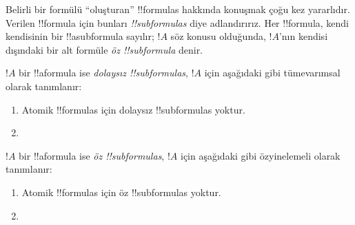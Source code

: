 



\begin{explain}
Belirli bir formülü ``oluşturan'' !!{formula}s hakkında konuşmak çoğu
kez yararlıdır. Verilen !!{formula} için bunları
\emph{!!{subformula}s} diye adlandırırız. Her !!{formula}, kendi kendisinin bir
!!a{subformula} sayılır; $!A$ söz konusu olduğunda, $!A$'nın kendisi dışındaki bir alt formüle
\emph{öz !!{subformula}} denir.
\end{explain}

\begin{defn}
$!A$ bir !!a{formula} ise \emph{dolaysız !!{subformula}s}, $!A$ için
aşağıdaki gibi tümevarımsal olarak tanımlanır:
\begin{enumerate}
\item Atomik !!{formula}s için dolaysız !!{subformula}s yoktur.


\item {}


\end{enumerate}
\end{defn}

\begin{defn}[Öz !!^{subformula}]
$!A$ bir !!a{formula} ise \emph{öz !!{subformula}s}, $!A$ için
aşağıdaki gibi özyinelemeli olarak tanımlanır:
\begin{enumerate}
\item Atomik !!{formula}s için öz !!{subformula}s yoktur.


\item {}


\end{enumerate}
\end{defn}

